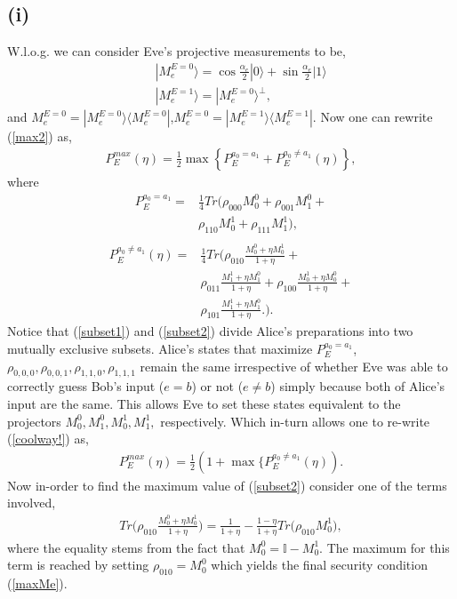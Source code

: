 \documentclass[smallextended]{svjour3}
\newcommand{\be}{\begin{eqnarray}}
\newcommand{\ee}{\end{eqnarray}}
\begin{document}
\subsection*{(i)}
W.l.o.g. we can consider Eve's projective measurements to be, 
\begin{eqnarray}
&& |M_e^{E=0}\rangle=\cos\frac{\alpha_e}{2}|0\rangle+\sin\frac{\alpha_e}{2}|1\rangle \nonumber \\
&& |M_e^{E=1}\rangle = |M_e^{E=0}\rangle^\perp \label{a4},
\end{eqnarray}
and $M_e^{E=0}=|M_e^{E=0}\rangle \langle M_e^{E=0} |$,$M_e^{E=0}=|M_e^{E=1}\rangle \langle M_e^{E=1}|$. Now one can rewrite (\ref{max2}) as,
\be \label{coolway!}
P_E^{max}(\eta) = \frac{1}{2}\max\left\{P_E^{a_0=a_1} + P_E^{a_0\neq a_1}(\eta) \right\},
\ee
where
\begin{equation} \label{subset1}
\begin{split}
P_E^{a_0 = a_1}=&
\frac{1}{4} Tr\bigg(\rho_{000}M^0_0 + \rho_{001}M^0_1 + \\
& \rho_{110}M^1_0 + \rho_{111}M^1_1\bigg), \\ 
\end{split}
\end{equation}
\begin{equation} \label{subset2}
\begin{split}
P_E^{a_0 \neq a_1}(\eta)= & \frac{1}{4} Tr\bigg(\rho_{010}\frac{M^0_0+\eta M^1_0}{1+\eta} + \\ & \rho_{011}\frac{M^1_1+\eta M^0_1}{1+\eta} + \rho_{100}\frac{M^1_0+\eta M^0_0}{1+\eta} + \\ & \rho_{101}\frac{M^1_1+\eta M^0_1}{1+\eta}\bigg.).
\end{split}
\end{equation}
Notice that (\ref{subset1}) and (\ref{subset2}) divide Alice's preparations into two mutually exclusive subsets. Alice's states that maximize $P_E^{a_0=a_1}$, $\rho_{0,0,0},\rho_{0,0,1},\rho_{1,1,0},\rho_{1,1,1}$ remain the same irrespective of whether Eve was able to correctly guess Bob's input ($e=b$) or not ($e\neq b$) simply because both of Alice's input are the same. This allows Eve to set these states equivalent to the projectors $M_0^0,M_1^0,M_0^1,M_1^1,$ respectively.   Which in-turn allows one to re-write (\ref{coolway!}) as,
\begin{equation}
\begin{split} \label{labelme}
P_E^{max}(\eta) = \frac{1}{2}(1+\max\{P_E^{a_0\neq a_1}(\eta)).
\end{split}
\end{equation}
Now in-order to find the maximum value of (\ref{subset2}) consider one of the terms involved,
\begin{equation}
\begin{split}
Tr\bigg(\rho_{010}\frac{M_0^0 + \eta M_0^1}{1+\eta}\bigg) = \frac{1}{1+\eta} - \frac{1-\eta}{1+\eta}Tr\bigg(\rho_{010}M_0^1\bigg),
\end{split}
\end{equation}
where the equality stems from the fact that $M_0^0=\mathbb{I}-M_0^1$.
The maximum for this term is reached by setting $\rho_{010}=M_0^0$ which yields the final security condition (\ref{maxMe}).
\end{document}
